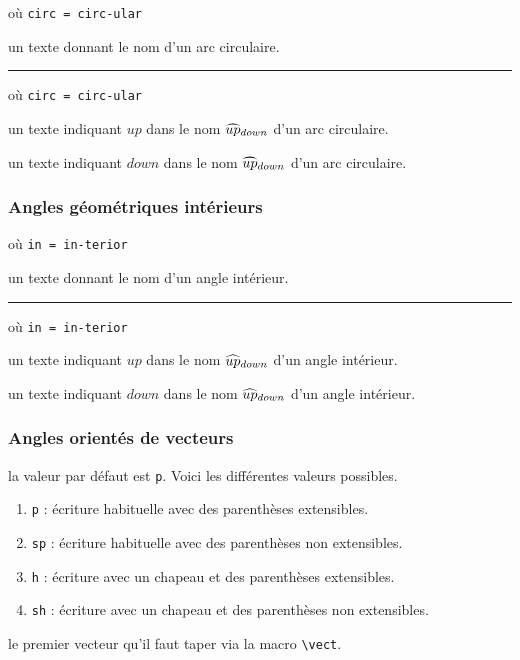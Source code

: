 \documentclass[12pt,a4paper]{article}
\newcommand\env[1]{\texttt{#1}}
\newcommand\macro[1]{\env{\textbackslash{}#1}}
\theoremstyle{definition}
\newcommand\separation{
	\medskip
	\hfill\rule{0.5\textwidth}{0.75pt}\hfill
	\medskip
}
\newcommand\mwhyprefix[2]{%
	\texttt{#1 = #1-#2}%
}
\begin{document}
 où \quad \mwhyprefix{circ}{ular}

\IDarg{} un texte donnant le nom d'un arc circulaire.


\separation


 où \quad \mwhyprefix{circ}{ular}

 un texte indiquant $up$ dans le nom $\circarc*{up}{down}$ d'un arc circulaire.

 un texte indiquant $down$ dans le nom $\circarc*{up}{down}$ d'un arc circulaire.
\subsubsection{Angles géométriques \og intérieurs \fg}

 où \quad \mwhyprefix{in}{terior}

\IDarg{} un texte donnant le nom d'un angle intérieur.


\separation


 où \quad \mwhyprefix{in}{terior}

 un texte indiquant $up$ dans le nom $\anglein*{up}{down}$ d'un angle intérieur.

 un texte indiquant $down$ dans le nom $\anglein*{up}{down}$ d'un angle intérieur.
\subsubsection{Angles orientés de vecteurs}


\IDoption{} la valeur par défaut est \verb+p+.  Voici les différentes valeurs possibles.
\begin{enumerate}
	\item \verb+p+ : écriture habituelle avec des parenthèses extensibles.

	\item \verb+sp+ : écriture habituelle avec des parenthèses non extensibles.

	\item \verb+h+ : écriture avec un chapeau et des parenthèses extensibles.

	\item \verb+sh+ : écriture avec un chapeau et des parenthèses non extensibles.
\end{enumerate}

 le premier vecteur qu'il faut taper via la macro \macro{vect}.
\end{document}
